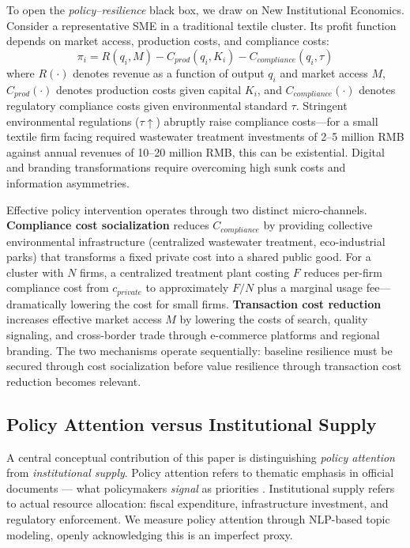 \documentclass[sustainability,article,submit,moreauthors,pdftex]{mdpi}
\begin{document}
To open the \emph{policy--resilience} black box, we draw on New Institutional Economics. Consider a representative SME in a traditional textile cluster. Its profit function depends on market access, production costs, and compliance costs:
\begin{equation}
    \pi_i = R(q_i, M) - C_{prod}(q_i, K_i) - C_{compliance}(q_i, \tau)
\end{equation}
where $R(\cdot)$ denotes revenue as a function of output $q_i$ and market access $M$, $C_{prod}(\cdot)$ denotes production costs given capital $K_i$, and $C_{compliance}(\cdot)$ denotes regulatory compliance costs given environmental standard $\tau$. Stringent environmental regulations ($\tau \uparrow$) abruptly raise compliance costs---for a small textile firm facing required wastewater treatment investments of 2--5 million RMB against annual revenues of 10--20 million RMB, this can be existential. Digital and branding transformations require overcoming high sunk costs and information asymmetries.

Effective policy intervention operates through two distinct micro-channels. \textbf{Compliance cost socialization} reduces $C_{compliance}$ by providing collective environmental infrastructure (centralized wastewater treatment, eco-industrial parks) that transforms a fixed private cost into a shared public good. For a cluster with $N$ firms, a centralized treatment plant costing $F$ reduces per-firm compliance cost from $c_{private}$ to approximately $F/N$ plus a marginal usage fee---dramatically lowering the cost for small firms. \textbf{Transaction cost reduction} increases effective market access $M$ by lowering the costs of search, quality signaling, and cross-border trade through e-commerce platforms and regional branding. The two mechanisms operate sequentially: baseline resilience must be secured through cost socialization before value resilience through transaction cost reduction becomes relevant.

\subsection{Policy Attention versus Institutional Supply}
A central conceptual contribution of this paper is distinguishing \emph{policy attention} from \emph{institutional supply}. Policy attention refers to thematic emphasis in official documents --- what policymakers \emph{signal} as priorities \citep{Flanagan2011}. Institutional supply refers to actual resource allocation: fiscal expenditure, infrastructure investment, and regulatory enforcement. We measure policy attention through NLP-based topic modeling, openly acknowledging this is an imperfect proxy.
\end{document}
